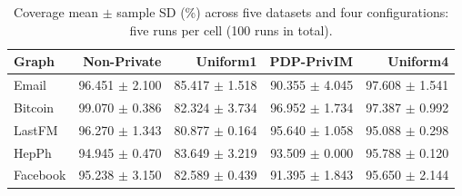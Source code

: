 \begin{table}[htbp]
\centering\small
\caption{Coverage mean $\pm$ sample SD (\%) across five datasets and four configurations: five runs per cell (100 runs in total).}\label{tab:coverage}
\begin{tabular}{lrrrr}
\toprule
Graph & Non-Private & Uniform1 & PDP-PrivIM & Uniform4\\ \midrule
Email & 96.451 $\pm$ 2.100 & 85.417 $\pm$ 1.518 & 90.355 $\pm$ 4.045 & 97.608 $\pm$ 1.541 \\
Bitcoin & 99.070 $\pm$ 0.386 & 82.324 $\pm$ 3.734 & 96.952 $\pm$ 1.734 & 97.387 $\pm$ 0.992 \\
LastFM & 96.270 $\pm$ 1.343 & 80.877 $\pm$ 0.164 & 95.640 $\pm$ 1.058 & 95.088 $\pm$ 0.298 \\
HepPh & 94.945 $\pm$ 0.470 & 83.649 $\pm$ 3.219 & 93.509 $\pm$ 0.000 & 95.788 $\pm$ 0.120 \\
Facebook & 95.238 $\pm$ 3.150 & 82.589 $\pm$ 0.439 & 91.395 $\pm$ 1.843 & 95.650 $\pm$ 2.144 \\
\bottomrule\end{tabular}
\end{table}
